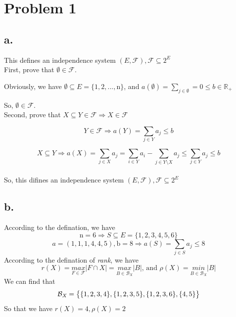 \documentclass{article}
\begin{document}
\pagestyle{fancy}

\section*{Problem 1}{
    \subsection*{a.}{
        This defines an independence system \((\mathit{E},\mathcal{F}), \mathcal{F} \subseteq \mathrm{2}^{\mathit{E}}\)\\

        First, prove that \(\emptyset \in \mathcal{F}\).

        Obviously, we have \(\emptyset \subseteq \mathit{E}=\{\mathrm{1,2,...,n}\}\), and \(\mathit{a}(\emptyset)=\sum_{\mathit{j} \in \emptyset}=\mathrm{0} \leqslant \mathit{b} \in \mathbb{R}_{+}\)

        So, \(\emptyset \in \mathcal{F}\).\\

        Second, prove that \(\mathit{X} \subseteq \mathit{Y} \in \mathcal{F} \Rightarrow \mathit{X} \in \mathcal{F}\)

        \[\mathit{Y} \in \mathcal{F} \Rightarrow \mathit{a}(\mathit{Y}) = \sum_{\mathit{j} \in \mathit{Y}}\mathit{a_j} \leqslant \mathit{b}\]

        \[\mathit{X} \subseteq \mathit{Y} \Rightarrow \mathit{a}(\mathit{X}) = \sum_{\mathit{j} \in \mathit{X}}\mathit{a_j} = \sum_{\mathit{i} \in \mathit{Y}}\mathit{a_i} - \sum_{\mathit{j} \in \mathit{Y} \setminus \mathit{X}}\mathit{a_j} \leqslant \sum_{\mathit{j} \in \mathit{Y}}\mathit{a_j} \leqslant \mathit{b}\]\\

        So, this difines an independence system \((\mathit{E},\mathcal{F}), \mathcal{F} \subseteq \mathrm{2}^{\mathit{E}}\)
    }
    \subsection*{b.}{
        According to the defination, we have
        \[\mathrm{n=6} \Rightarrow \mathit{S} \subseteq \mathit{E} = \{ \mathrm{1,2,3,4,5,6}\}\]
        \[\mathit{a}=\mathrm{(1,1,1,4,4,5), b=8} \Rightarrow \mathit{a}(\mathit{S}) = \sum_{\mathit{j} \in \mathit{S}}\mathit{a_j} \leqslant \mathrm{8}\]
        According to the defination of \textit{rank}, we have
        \[\mathit{r(X)}=\underset{\mathit{F} \in \mathcal{F}}{\mathit{max}} \lvert \mathit{F} \cap \mathit{X} \rvert=\underset{\mathit{B} \in \mathcal{B}_{\mathit{X}}} {\mathit{max}} \lvert \mathit{B} \rvert \text{, and } \mathit{\rho(X)} = \underset{\mathit{B} \in \mathcal{B}_{\mathit{X}}} {\mathit{min}} \lvert \mathit{B} \rvert\]
        We can find that
        \[\mathcal{B}_{\mathit{X}} = \mathrm{\big{\{} \{1,2,3,4\}, \{1,2,3,5\}, \{1,2,3,6\}, \{4,5\}\big{\}}}\]
        So that we have \(\mathit{r(X)}=\mathrm{4}, \mathit{\rho(X)}=\mathrm{2}\)
    }
}
\end{document}
